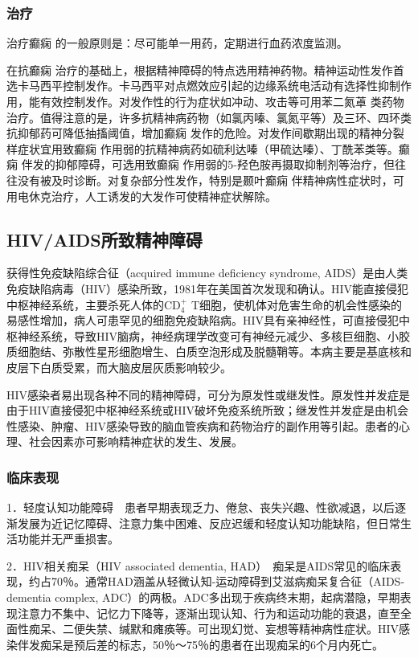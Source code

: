 \subsubsection{治疗}

治疗癫痫
的一般原则是：尽可能单一用药，定期进行血药浓度监测。

在抗癫痫
治疗的基础上，根据精神障碍的特点选用精神药物。精神运动性发作首选卡马西平控制发作。卡马西平对点燃效应引起的边缘系统电活动有选择性抑制作用，能有效控制发作。对发作性的行为症状如冲动、攻击等可用苯二氮䓬
类药物治疗。值得注意的是，许多抗精神病药物（如氯丙嗪、氯氮平等）及三环、四环类抗抑郁药可降低抽搐阈值，增加癫痫
发作的危险。对发作间歇期出现的精神分裂样症状宜用致癫痫
作用弱的抗精神病药如硫利达嗪（甲硫达嗪）、丁酰苯类等。癫痫
伴发的抑郁障碍，可选用致癫痫
作用弱的5-羟色胺再摄取抑制剂等治疗，但往往没有被及时诊断。对复杂部分性发作，特别是颞叶癫痫
伴精神病性症状时，可用电休克治疗，人工诱发的大发作可使精神症状解除。

\subsection{HIV/AIDS所致精神障碍}

获得性免疫缺陷综合征（acquired immune deficiency syndrome,
AIDS）是由人类免疫缺陷病毒（HIV）感染所致，1981年在美国首次发现和确认。HIV能直接侵犯中枢神经系统，主要杀死人体的$\text{CD}^+_4$
T细胞，使机体对危害生命的机会性感染的易感性增加，病人可患罕见的细胞免疫缺陷病。HIV具有亲神经性，可直接侵犯中枢神经系统，导致HIV脑病，神经病理学改变可有神经元减少、多核巨细胞、小胶质细胞结、弥散性星形细胞增生、白质空泡形成及脱髓鞘等。本病主要是基底核和皮层下白质受累，而大脑皮层灰质影响较少。

HIV感染者易出现各种不同的精神障碍，可分为原发性或继发性。原发性并发症是由于HIV直接侵犯中枢神经系统或HIV破坏免疫系统所致；继发性并发症是由机会性感染、肿瘤、HIV感染导致的脑血管疾病和药物治疗的副作用等引起。患者的心理、社会因素亦可影响精神症状的发生、发展。

\subsubsection{临床表现}

1．轻度认知功能障碍　患者早期表现乏力、倦怠、丧失兴趣、性欲减退，以后逐渐发展为近记忆障碍、注意力集中困难、反应迟缓和轻度认知功能缺陷，但日常生活功能并无严重损害。

2．HIV相关痴呆（HIV associated dementia,
HAD）　痴呆是AIDS常见的临床表现，约占70％。通常HAD涵盖从轻微认知-运动障碍到艾滋病痴呆复合征（AIDS-dementia
complex,
ADC）的两极。ADC多出现于疾病终末期，起病潜隐，早期表现注意力不集中、记忆力下降等，逐渐出现认知、行为和运动功能的衰退，直至全面性痴呆、二便失禁、缄默和瘫痪等。可出现幻觉、妄想等精神病性症状。HIV感染伴发痴呆是预后差的标志，50％～75％的患者在出现痴呆的6个月内死亡。

